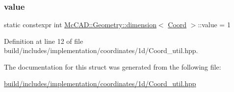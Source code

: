 \subsubsection{\texorpdfstring{value}{value}}
{\footnotesize\ttfamily static constexpr int \hyperlink{structMcCAD_1_1Geometry_1_1dimension}{Mc\+C\+A\+D\+::\+Geometry\+::dimension}$<$ \hyperlink{classMcCAD_1_1Geometry_1_1Coord}{Coord} $>$\+::value = 1\hspace{0.3cm}{\ttfamily [static]}}



Definition at line 12 of file build/includes/implementation/coordinates/1d/\+Coord\+\_\+util.\+hpp.



The documentation for this struct was generated from the following file\+:\begin{DoxyCompactItemize}
\item 
\hyperlink{build_2includes_2implementation_2coordinates_21d_2Coord__util_8hpp}{build/includes/implementation/coordinates/1d/\+Coord\+\_\+util.\+hpp}\end{DoxyCompactItemize}

